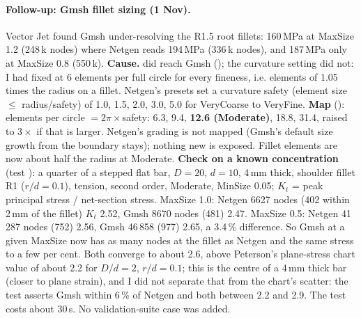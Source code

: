 \paragraph{Follow-up: Gmsh fillet sizing (1 Nov).} Vector Jet found Gmsh under-resolving the R1.5 root fillets: 160\,MPa at MaxSize 1.2
(248\,k nodes) where Netgen reads 194\,MPa (336\,k nodes), and 187\,MPa only at MaxSize 0.8 (550\,k). \textbf{Cause.}  did
reach Gmsh (); the curvature setting did not: I had fixed  at 6 elements per full circle for
every fineness, i.e. elements of 1.05 times the radius on a fillet. Netgen's presets set a curvature safety (element size
$\le$ radius/safety) of 1.0, 1.5, 2.0, 3.0, 5.0 for VeryCoarse to VeryFine. \textbf{Map} ():
elements per circle $=2\pi\times$safety: 6.3, 9.4, \textbf{12.6 (Moderate)}, 18.8, 31.4, raised to $3\times$ if that is larger. Netgen's
grading is not mapped (Gmsh's default size growth from the boundary stays); nothing new is exposed. Fillet elements are now about
half the radius at Moderate. \textbf{Check on a known concentration} (test ):
a quarter of a stepped flat bar, $D=20$, $d=10$, 4\,mm thick, shoulder fillet R1 ($r/d=0.1$), tension, second order, Moderate, MinSize
0.05; $K_t$ = peak principal stress / net-section stress. MaxSize 1.0: Netgen 6627 nodes (402 within 2\,mm of the fillet) $K_t$ 2.52,
Gmsh 8670 nodes (481) 2.47. MaxSize 0.5: Netgen 41\,287 nodes (752) 2.56, Gmsh 46\,858 (977) 2.65, a 3.4\,\% difference. So Gmsh at a given
MaxSize now has as many nodes at the fillet as Netgen and the same stress to a few per cent. Both converge to about 2.6, above
Peterson's plane-stress chart value of about 2.2 for $D/d=2$, $r/d=0.1$; this is the centre of a 4\,mm thick bar (closer to plane strain), and
I did not separate that from the chart's scatter: the test asserts Gmsh within 6\,\% of Netgen and both between 2.2 and 2.9.
The test costs about 30\,s. No validation-suite case was added.
